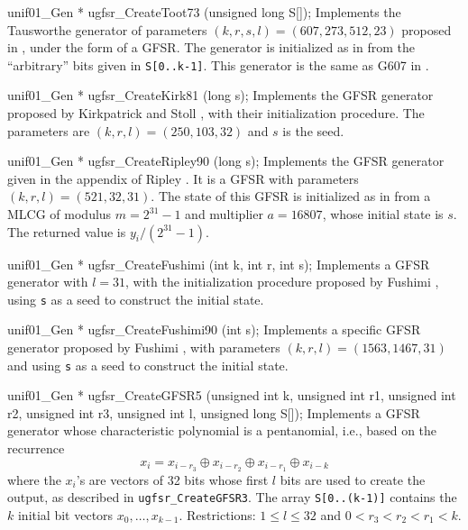 unif01_Gen * ugfsr_CreateToot73 (unsigned long S[]);
\endcode
  \tab Implements the Tausworthe generator
   of parameters $(k,r,s,l) = (607, 273, 512, 23)$  proposed
   in \cite{rTOO73a}, under the form of a GFSR.
   The generator is initialized as in \cite{rTOO73a}
%
   from the ``arbitrary'' bits  given in {\tt S[0..k-1]}.
   This generator is the same as G607 in \cite{rMAT94a}.
\endtab
\code


unif01_Gen * ugfsr_CreateKirk81 (long s);
\endcode
  \tab Implements the GFSR generator proposed by
   Kirkpatrick and Stoll \cite{rKIR81a}, with their
%
   initialization procedure.
   The parameters are $(k,r,l) = (250, 103, 32)$ and $s$ is the seed. 
  \endtab
\code


unif01_Gen * ugfsr_CreateRipley90 (long s);
\endcode
  \tab Implements the GFSR generator given in the appendix
   of Ripley \cite{rRIP90a}.
%
   It is a GFSR with parameters $(k, r, l) = (521, 32, 31)$.
   The state of this GFSR is initialized as in \cite{rRIP90a}
   from a MLCG of modulus $m=2^{31}-1$ and  multiplier
   $a = 16807$, whose initial state is $s$. The returned value
   is $y_i/(2^{31} - 1)$.
  \endtab
\code


unif01_Gen * ugfsr_CreateFushimi (int k, int r, int s);
\endcode
  \tab Implements a GFSR generator with $l = 31$, with the 
%
   initialization procedure proposed by Fushimi \cite{rFUS90a},
   using {\tt s} as a seed to construct the initial state. 
  \endtab
\code


unif01_Gen * ugfsr_CreateFushimi90 (int s);
\endcode
  \tab Implements a specific GFSR generator proposed by
   Fushimi \cite{rFUS90a}, with parameters $(k,r,l) = (1563, 1467, 31)$
   and using {\tt s} as a seed to construct the initial state. 
  \endtab
\code


unif01_Gen * ugfsr_CreateGFSR5 (unsigned int k, unsigned int r1,
                                unsigned int r2, unsigned int r3,
                                unsigned int l, unsigned long S[]);
\endcode
  \tab Implements a GFSR generator whose characteristic polynomial
   is a pentanomial, i.e., based on the recurrence
    $$ x_i = x_{i-r_3} \oplus x_{i-r_2} \oplus x_{i-r_1} \oplus x_{i-k} $$
   where the $x_i$'s are vectors of 32  bits whose first  $l$
   bits are used to create the output, as described in
   {\tt ugfsr\_CreateGFSR3}.    The array {\tt S[0..(k-1)]}
   contains the $k$ initial bit vectors $x_0, \dots, x_{k-1}$.
   Restrictions: $1 \le l \le 32$ and $0 < r_3 < r_2 < r_1 < k$.
  \endtab
\code


